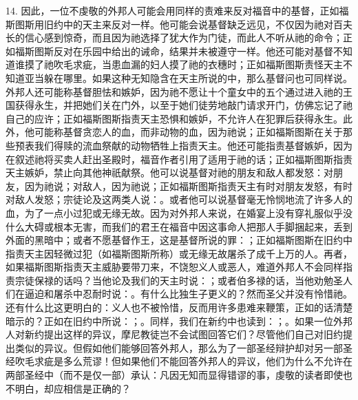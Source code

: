 14. 因此，一位不虔敬的外邦人可能会用同样的责难来反对福音中的基督，正如福斯图斯用旧约中的天主来反对一样。他可能会说基督缺乏远见，不仅因为祂对百夫长的信心感到惊奇，而且因为祂选择了犹大作为门徒，而此人不听从祂的命令；正如福斯图斯反对在乐园中给出的诫命，结果并未被遵守一样。他还可能对基督不知道谁摸了祂吹毛求疵，当患血漏的妇人摸了祂的衣穗时；正如福斯图斯责怪天主不知道亚当躲在哪里。如果这种无知隐含在天主所说的中，那么基督问也可同样说。外邦人还可能称基督胆怯和嫉妒，因为祂不愿让十个童女中的五个通过进入祂的王国获得永生，并把她们关在门外，以至于她们徒劳地敲门请求开门，仿佛忘记了祂自己的应许；正如福斯图斯指责天主恐惧和嫉妒，不允许人在犯罪后获得永生。此外，他可能称基督贪恋人的血，而非动物的血，因为祂说；正如福斯图斯在关于那些预表我们得赎的流血祭献的动物牺牲上指责天主。他还可能指责基督嫉妒，因为在叙述祂将买卖人赶出圣殿时，福音作者引用了适用于祂的话；正如福斯图斯指责天主嫉妒，禁止向其他神祇献祭。他可以说基督对祂的朋友和敌人都发怒：对朋友，因为祂说；对敌人，因为祂说；正如福斯图斯指责天主有时对朋友发怒，有时对敌人发怒；宗徒论及这两类人说：。或者他可以说基督毫无怜悯地流了许多人的血，为了一点小过犯或无缘无故。因为对外邦人来说，在婚宴上没有穿礼服似乎没什么大碍或根本无害，而我们的君王在福音中因这事命人把那人手脚捆起来，丢到外面的黑暗中；或者不愿基督作王，这是基督所说的罪：；正如福斯图斯在旧约中指责天主因轻微过犯（如福斯图斯所称）或无缘无故屠杀了成千上万的人。再者，如果福斯图斯指责天主威胁要带刀来，不饶恕义人或恶人，难道外邦人不会同样指责宗徒保禄的话吗？当他论及我们的天主时说：；或者伯多禄的话，当他劝勉圣人们在逼迫和屠杀中忍耐时说：。有什么比独生子更义的？然而圣父并没有怜惜祂。还有什么比这更明白的：义人也不被怜惜，反而用许多患难来鞭策，正如的话清楚暗示的？正如在旧约中所说：；。同样，我们在新约中也读到：；。如果一位外邦人对新约提出这样的异议，摩尼教徒岂不会试图回答它们？尽管他们自己对旧约提出类似的异议。但假如他们能够回答外邦人，那么为了一部圣经辩护却对另一部圣经吹毛求疵是多么荒谬！但如果他们不能回答外邦人的异议，他们为什么不允许在两部圣经中（而不是仅一部）承认：凡因无知而显得错谬的事，虔敬的读者即使也不明白，却应相信是正确的？\par

